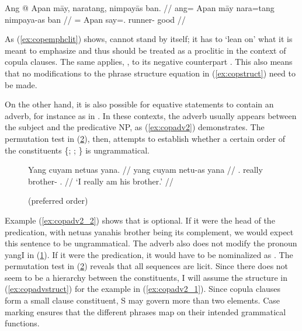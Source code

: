 \ex\label{ex:copemphclit}\ljudge*\begingl
	\gla Ang @ Apan māy, naratang, nimpayās ban. //
	\glb ang= Apan māy nara=tang nimpaya-as ban //
	\glc \Aarg{}= Apan \Int{} say=\TplM{}.\Aarg{} runner-\Parg{} good //
\endgl\xe

As (\ref{ex:copemphclit}) shows,  cannot stand by itself; it
has to `lean on' what it is meant to emphasize and thus should be treated as a
proclitic in the context of copula clauses. The same applies, , to its negative counterpart . This also means that
no modifications to the phrase structure equation in (\ref{ex:copstruct}) need
to be made.

On the other hand, it is also possible for equative statements to contain an
adverb, for instance as in . In these contexts, the
adverb usually appears between the subject and the predicative NP, as
(\ref{ex:copadv2}) demonstrates. The permutation test in (\ref{ex:copadvperm}),
then, attempts to establish whether a certain order of the constituents 
\{; ; \} is ungrammatical.

\begin{figure}
\pex\label{ex:copadv2}
\a\label{ex:copadv2_1}\begingl
	\gla Yang cuyam netuas yana. //
	\glb yang cuyam netu-as yana //
	\glc \Fsg{}.\Aarg{} really brother-\Parg{} \TsgM{}.\Gen{} //
	\glft `I really am his brother.' //
\endgl

\a\label{ex:copadv2_2}%

\a\label{ex:copadv2_3}\ljudge*%

\xe
\end{figure}

\begin{figure}
\pex\label{ex:copadvperm}
\a{} (preferred order)
\a{}
\a{}
\a{}
\a{}
\a{}
\xe
\end{figure}

Example (\ref{ex:copadv2_2}) shows that  is
optional. If it were the head of the predication, with 
{netuas yana}{his brother} being its complement, we would expect this sentence
to be ungrammatical. The adverb also does not modify the pronoun 
{yang}{I} in (\ref{ex:copadv2_3}). If it were the predication, it would have to
be nominalized as . The permutation test in
(\ref{ex:copadvperm}) reveals that all sequences are licit. Since there does
not seem to be a hierarchy between the constituents, I will assume the
structure in (\ref{ex:copadvstruct}) for the example in (\ref{ex:copadv2_1}).
Since copula clauses form a small clause constituent, S may govern more than
two elements. Case marking ensures that the different phrases map on their
intended grammatical functions.

